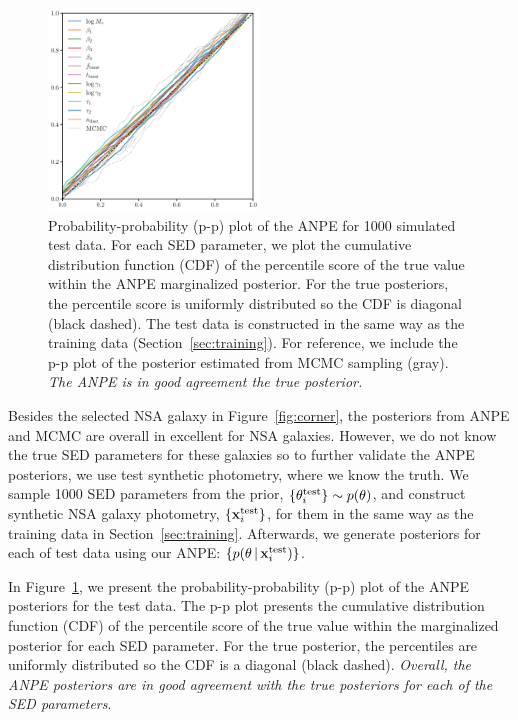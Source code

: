 \begin{figure}
\begin{center}
    \includegraphics[width=0.5\textwidth]{figs/ppplot.pdf}
    \caption{\label{fig:pp}
    Probability-probability (p-p) plot of the ANPE for 1000 simulated test data. 
    For each SED parameter, we plot the cumulative distribution function (CDF) of the
    percentile score of the true value within the ANPE marginalized posterior.
    For the true posteriors, the percentile score is uniformly distributed so
    the CDF is diagonal (black dashed).
    The test data is constructed in the same way as the training data
    (Section~\ref{sec:training}). 
    For reference, we include the p-p plot of the posterior estimated from MCMC
    sampling (gray). 
    \emph{The ANPE is in good agreement the true posterior.}
    }
\end{center}
\end{figure}
Besides the selected NSA galaxy in Figure~\ref{fig:corner}, the posteriors from
ANPE and MCMC are overall in excellent for NSA galaxies.
However, we do not know the true SED parameters for these galaxies so to
further validate the ANPE posteriors, we use test synthetic photometry, where
we know the truth.
We sample 1000 SED parameters from the prior,
$\{\theta^{\rm test}_i\} \sim p(\theta)$, 
and construct synthetic NSA galaxy photometry, 
$\{{\bf x}^{\rm test}_i\}$, 
for them in the same way as the training data in Section~\ref{sec:training}. 
Afterwards, we generate posteriors for each of test data using our ANPE: 
$\{ p(\theta \,|\, {\bf x}^{\rm test}_i)\}$. 

In Figure~\ref{fig:pp}, we present the probability-probability (p-p) plot of
the ANPE posteriors for the test data. 
The p-p plot presents the cumulative distribution function (CDF) of the
percentile score of the true value within the marginalized posterior for each
SED parameter. 
For the true posterior, the percentiles are uniformly distributed so the CDF
is a diagonal (black dashed).
\emph{Overall, the ANPE posteriors are in good agreement with the true
posteriors for each of the SED parameters}.

